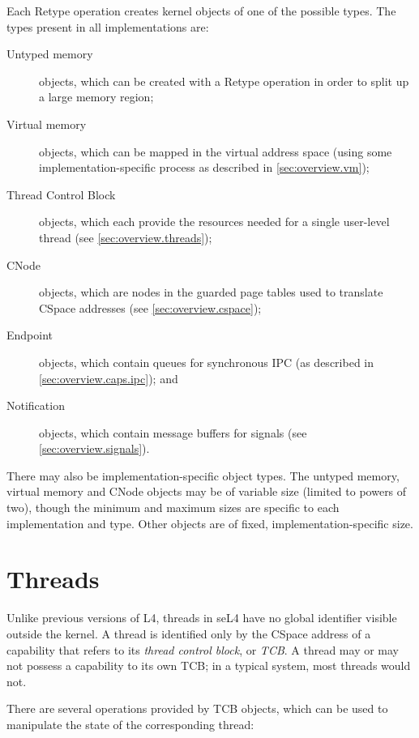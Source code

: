 Each Retype operation creates kernel objects of one of the possible types. The
types present in all implementations are:

\begin{description}
\item [Untyped memory] objects, which can be created with a Retype operation
in order to split up a large memory region;
\item [Virtual memory] objects, which can be mapped in the virtual address
space (using some implementation-specific process as described in
\autoref{sec:overview.vm});
\item [Thread Control Block] objects, which each provide the resources needed
for a single user-level thread (see \autoref{sec:overview.threads});
\item [CNode] objects, which are nodes in the guarded page tables used to
translate CSpace addresses (see \autoref{sec:overview.cspace});
\item [Endpoint] objects, which contain queues for synchronous IPC (as
described in \autoref{sec:overview.caps.ipc}); and
\item [Notification] objects, which contain message buffers for
signals (see \autoref{sec:overview.signals}).
\end{description}

There may also be implementation-specific object types. The untyped
memory, virtual memory and CNode objects may be of variable size (limited to
powers of two), though the minimum and maximum sizes are specific to each
implementation and type. Other objects are of fixed, implementation-specific
size.

\section{Threads}\label{sec:overview.threads}

Unlike previous versions of L4, threads in seL4 have no global identifier
visible outside the kernel. A thread is identified only by the CSpace address
of a capability that refers to its \emph{thread control block}, or \emph{TCB}.
A thread may or may not possess a capability to its own TCB; in a typical
system, most threads would not.

There are several operations provided by TCB objects, which can be used to
manipulate the state of the corresponding thread:

